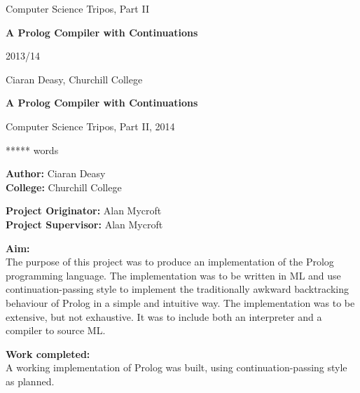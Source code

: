 \documentclass[12pt]{article}
\begin{document}
\thispagestyle{empty}

\medskip
{}
\medskip
{}

\vfil

\centerline{\large Computer Science Tripos, Part II}
\vspace{0.4in}
\centerline{\Large\bf A Prolog Compiler with Continuations}
\vspace{0.3in}
\centerline{\large 2013/14}
\vspace{2.5in}

\newpage
\hspace{5px}
\newpage

\vfil

\centerline{\large Ciaran Deasy, Churchill College}
\vspace{0.4in}
\centerline{\Large\bf A Prolog Compiler with Continuations}
\vspace{0.3in}
\centerline{\large Computer Science Tripos, Part II, 2014}
\vspace{0.1in}
\centerline{ ***** words}
\vspace{0.25in}

{\bf Author:} Ciaran Deasy\\
{\bf College:} Churchill College

\vspace{0.25in}

{\bf Project Originator:} Alan Mycroft\\
{\bf Project Supervisor:} Alan Mycroft

\vspace{0.25in}

{\bf Aim:}\\
The purpose of this project was to produce an implementation of the Prolog programming language. The implementation was to be written in ML and use continuation-passing style to implement the traditionally awkward backtracking behaviour of Prolog in a simple and intuitive way. The implementation was to be extensive, but not exhaustive. It was to include both an interpreter and a compiler to source ML. %

\vspace{0.25in}

{\bf Work completed:}\\
A working implementation of Prolog was built, using continuation-passing style as planned. %

\vspace{0.25in}
\end{document}
